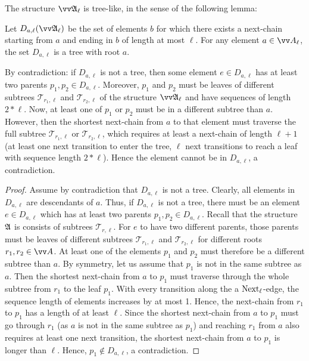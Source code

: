 \noindent
The structure $\unravel{A}_{\ell}$ is tree-like, in the sense of the following lemma:
\begin{lemma}\label{lem:companion-tree-like}
  Let $D_{a, \ell}(\unravel{A}_{\ell})$ be the set of elements $b$ for which there exists a next-chain starting from $a$ and ending in $b$ of length at most $\ell$.
  For any element $a \in \unraveldom{A}_{\ell}$, the set $D_{a, \ell}$ is a tree with root $a$.
\end{lemma}
\begin{proofsketch}
  By contradiction: if $D_{a,\ell}$ is not a tree, then some element $e \in D_{a,\ell}$ has at least two parents $p_{1}, p_{2} \in D_{a,\ell}$.
  Moreover, $p_{1}$ and $p_{2}$ must be leaves of different subtrees $\mathcal{T}_{r_{1},\ell}$ and $\mathcal{T}_{r_{2},\ell}$ of the structure $\unravel{A}_{\ell}$ and have sequences of length $2 * \ell$.
  Now, at least one of $p_{1}$ or $p_{2}$ must be in a different subtree than $a$.
  However, then the shortest next-chain from $a$ to that element must traverse the full subtree $\mathcal{T}_{r_{1},\ell}$ or $\mathcal{T}_{r_{2},\ell}$, which requires at least a next-chain of length $\ell + 1$ (at least one next transition to enter the tree, $\ell$ next transitions to reach a leaf with sequence length $2 * \ell$).
  Hence the element cannot be in $D_{a,\ell}$, a contradiction.
\end{proofsketch}
\begin{proof}
  Assume by contradiction that $D_{a,\ell}$ is not a tree.
  Clearly, all elements in $D_{a,\ell}$ are descendants of $a$.
  Thus, if $D_{a,\ell}$ is not a tree, there must be an element $e \in D_{a,\ell}$ which has at least two parents $p_{1}, p_{2} \in D_{a,\ell}$.
  Recall that the structure ${\mathfrak{A}}$ is consists of subtrees $\mathcal{T}_{r,\ell}$.
  For $e$ to have two different parents, those parents must be leaves of different subtrees $\mathcal{T}_{r_{1},\ell}$ and $\mathcal{T}_{r_{2}, \ell}$ for different roots $r_{1}, r_{2} \in \unraveldom{A}$.
  At least one of the elements $p_{1}$ and $p_{2}$ must therefore be a different subtree than $a$.
  By symmetry, let us assume that $p_{1}$ is not in the same subtree as $a$.
  Then the shortest next-chain from $a$ to $p_{1}$ must traverse through the whole subtree from $r_{1}$ to the leaf $p_{1}$.
  With every transition along the a $\mathrm{Next}_{\ell}$-edge, the sequence length of elements increases by at most 1.
  Hence, the next-chain from $r_{1}$ to $p_{1}$ has a length of at least $\ell$.
  Since the shortest next-chain from $a$ to $p_{1}$ must go through $r_{1}$ (as $a$ is not in the same subtree as $p_{1}$) and reaching $r_{1}$ from $a$ also requires at least one next transition, the shortest next-chain from $a$ to $p_{1}$ is longer than $\ell$.
  Hence, $p_{1} \notin D_{a,\ell}$, a contradiction.
\end{proof}

